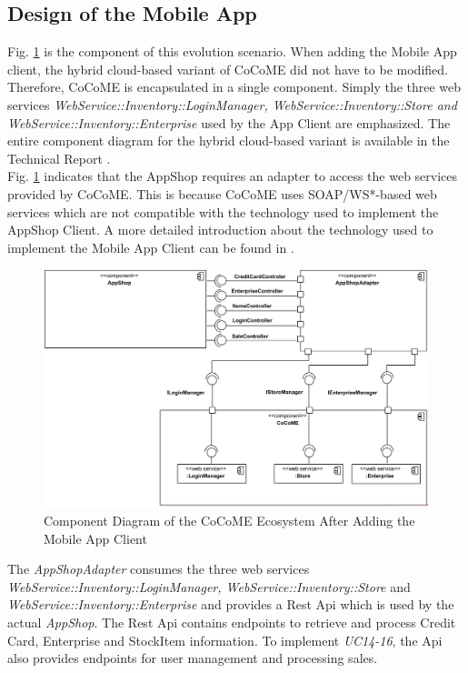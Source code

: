 \subsection{Design of the Mobile App}\label{DesignMobileApp}
 Fig. \ref{ComponentApp} is the component of this evolution scenario. When adding the Mobile App client, the hybrid cloud-based variant of CoCoME did not have to be modified. Therefore, CoCoME is encapsulated in a single component. Simply the three web services \textit{WebService::Inventory::LoginManager, WebService::Inventory::Store and WebService::Inventory::Enterprise} used by the App Client are emphasized. The entire component diagram for the hybrid cloud-based variant is available in the Technical Report \cite{HeinrichRostamiReussner2016_1000052688}. 
 \\ Fig. \ref{ComponentApp} indicates that the AppShop requires an adapter to access the web services provided by CoCoME. This is because CoCoME uses SOAP/WS*-based web services which are not compatible with the technology used to implement the AppShop Client. A more detailed introduction about the technology used to implement the Mobile App Client can be found in \cite{schnabel}. 
  
 \begin{figure}[!h]
	\includegraphics[width=\textwidth]{img/appComponent.png}
	\caption{Component Diagram of the CoCoME Ecosystem After Adding the Mobile App Client}
	\label{ComponentApp}
\end{figure}

  The \textit{AppShopAdapter} consumes the three web services \textit{WebService::Inventory::LoginManager, WebService::Inventory::Store} and \textit{WebService::Inventory::Enterprise} and provides a Rest Api which is used by the actual \textit{AppShop}. The Rest Api contains endpoints to retrieve and process Credit Card, Enterprise and StockItem information. To implement \emph{UC14-16}, the Api also provides endpoints for user management and processing sales. 
  
